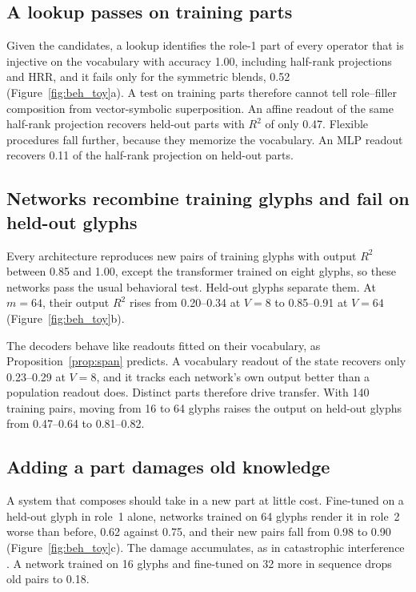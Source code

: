 \documentclass[10pt]{article}
\theoremstyle{plain}
\theoremstyle{remark}
\begin{document}
\subsection{A lookup passes on training parts}
\label{sec:lookup}

Given the candidates, a lookup identifies the role-1 part of every operator that is injective on the vocabulary with accuracy 1.00, including half-rank projections and HRR, and it fails only for the symmetric blends, 0.52 (Figure~\ref{fig:beh_toy}a). A test on training parts therefore cannot tell role--filler composition from vector-symbolic superposition. An affine readout of the same half-rank projection recovers held-out parts with $R^2$ of only 0.47. Flexible procedures fall further, because they memorize the vocabulary. An MLP readout recovers 0.11 of the half-rank projection on held-out parts.

\subsection{Networks recombine training glyphs and fail on held-out glyphs}
\label{sec:networks}

Every architecture reproduces new pairs of training glyphs with output $R^2$ between 0.85 and 1.00, except the transformer trained on eight glyphs, so these networks pass the usual behavioral test. Held-out glyphs separate them. At $m = 64$, their output $R^2$ rises from 0.20--0.34 at $V = 8$ to 0.85--0.91 at $V = 64$ (Figure~\ref{fig:beh_toy}b).

The decoders behave like readouts fitted on their vocabulary, as Proposition~\ref{prop:span} predicts. A vocabulary readout of the state recovers only 0.23--0.29 at $V = 8$, and it tracks each network's own output better than a population readout does. Distinct parts therefore drive transfer. With 140 training pairs, moving from 16 to 64 glyphs raises the output on held-out glyphs from 0.47--0.64 to 0.81--0.82.

\subsection{Adding a part damages old knowledge}
\label{sec:adding}

A system that composes should take in a new part at little cost. Fine-tuned on a held-out glyph in role~1 alone, networks trained on 64 glyphs render it in role~2 worse than before, 0.62 against 0.75, and their new pairs fall from 0.98 to 0.90 (Figure~\ref{fig:beh_toy}c). The damage accumulates, as in catastrophic interference \citep{mccloskey1989}. A network trained on 16 glyphs and fine-tuned on 32 more in sequence drops old pairs to 0.18.
\end{document}
